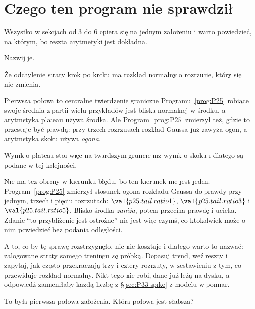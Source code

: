 \section{Czego ten program nie sprawdził}
\label{sec:P33-unchecked}

\begin{fr}
Wszystko w sekcjach od 3 do 6 opiera się na jednym założeniu i warto
powiedzieć, na którym, bo reszta arytmetyki jest dokładna.

Nazwij je.
\dotline
\nextframe
\end{fr}

\begin{fr}
\begin{ansblock}
Że odchylenie straty krok po kroku ma rozkład normalny o rozrzucie, który się
nie zmienia.
\end{ansblock}

Pierwsza połowa to centralne twierdzenie graniczne Programu~\ref{prog:P25}
robiące swoje \dash{} średnia z partii wielu przykładów jest bliska normalnej
w środku, a arytmetyka plateau używa środka. Ale Program~\ref{prog:P25}
zmierzył też, gdzie to przestaje być prawdą: przy trzech rozrzutach rozkład
Gaussa już zawyża ogon, a arytmetyka skoku używa \emph{ogona}.

Wynik o plateau stoi więc na twardszym gruncie niż wynik o skoku i dlatego są
podane w tej kolejności.

Nie ma też obrony w kierunku błędu, bo ten kierunek nie jest jeden.
Program~\ref{prog:P25} zmierzył stosunek ogona rozkładu Gaussa do prawdy przy
jednym, trzech i pięciu rozrzutach: $\val{p25.tail.ratio1}$,
$\val{p25.tail.ratio3}$ i $\val{p25.tail.ratio5}$. Blisko środka
\emph{zaniża}, potem przecina prawdę i ucieka. Zdanie \enquote{to
przybliżenie jest ostrożne} nie jest więc czymś, co ktokolwiek może o nim
powiedzieć bez podania odległości.

A to, co by tę sprawę rozstrzygnęło, nic nie kosztuje i dlatego warto to
nazwać: zalogowane straty samego treningu \emph{są} próbką. Dopasuj trend,
weź reszty i zapytaj, jak często przekraczają trzy i cztery rozrzuty, w
zestawieniu z tym, co przewiduje rozkład normalny. Nikt tego nie robi, dane
już leżą na dysku, a odpowiedź zamieniłaby każdą liczbę z
\S\ref{sec:P33-spike} z modelu w pomiar.

To była pierwsza połowa założenia. Która połowa jest słabsza?
\dotline
\nextframe
\end{fr}

